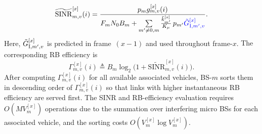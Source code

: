 \documentclass[10pt,journal,letterpaper]{journal_template/IEEEtran}
\newcommand{\rev}[1]{\textcolor{revisioncolor}{{}#1}}
\newif\ifshowdeletions
\newcommand{\currentdel}[1]{\ifshowdeletions\textcolor{deletioncolor}{\sout{#1}}\fi}
\theoremstyle{remark}
\begin{document}
\currentdel{Since the exact inter-cell interference in slot-$i$ is unknown, BS-$m$ approximates the SINR by leveraging the estimated frame-averaged RB usages $\{\Tilde{k}_{m'}^{[x]}\}$ obtained from GAP-HO:}
\begin{equation}
\label{eq:OTR-RA_SINR_hat}
    \widetilde{\mathrm{SINR}}_{m,v}^{[x]}(i)
    =
    \frac{p_m g_{m,v}^{[x]}(i)}
         {F_m N_0 B_m
          + \sum\limits_{m'\neq 0,m}
            \frac{\Tilde{k}_{m'}^{[x]}}{K_\mu}\, p_{m'} \currentdel{\ensuremath{g_{{\rm I},m',v}^{[x]}(i)}}\rev{\Tilde{G}_{{\rm I},m',v}^{[x]}}}.
\end{equation}
\rev{Here, $\Tilde{G}_{{\rm I},m',v}^{[x]}$ is predicted in frame~$(x-1)$ and used throughout frame-$x$.}
The corresponding RB efficiency is
\begin{equation}
    \label{eq:OTR-RA_RBe}
    \Gamma_{m,v}^{[x]}(i)
    \triangleq
    B_m\log_2\!\bigl(1+\widetilde{\mathrm{SINR}}_{m,v}^{[x]}(i)\bigr).
\end{equation}
After computing $\Gamma_{m,v}^{[x]}(i)$ for all \rev{available }associated vehicles, BS-$m$ sorts them in descending order of $\Gamma_{m,v}^{[x]}(i)$ so that links with higher instantaneous RB efficiency are served first. The SINR and RB-efficiency evaluation requires $O (MV^{[x]}_{m} )$ operations due to the summation over interfering micro BSs for each associated vehicle, and the sorting costs $O (V^{[x]}_{m}\log V^{[x]}_{m} )$.
\end{document}

